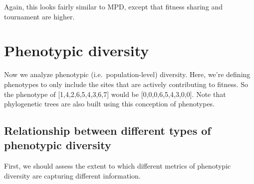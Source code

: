 \documentclass[]{book}
\newenvironment{Shaded}{\begin{snugshade}}{\end{snugshade}}
\newcommand{\DataTypeTok}[1]{\textcolor[rgb]{0.13,0.29,0.53}{#1}}
\newcommand{\DecValTok}[1]{\textcolor[rgb]{0.00,0.00,0.81}{#1}}
\newcommand{\KeywordTok}[1]{\textcolor[rgb]{0.13,0.29,0.53}{\textbf{#1}}}
\newcommand{\NormalTok}[1]{#1}
\newcommand{\OperatorTok}[1]{\textcolor[rgb]{0.81,0.36,0.00}{\textbf{#1}}}
\newcommand{\StringTok}[1]{\textcolor[rgb]{0.31,0.60,0.02}{#1}}
\begin{document}
Again, this looks fairly similar to MPD, except that fitness sharing and tournament are higher.

\hypertarget{phenotypic-diversity}{%
\section{Phenotypic diversity}\label{phenotypic-diversity}}

Now we analyze phenotypic (i.e.~population-level) diversity. Here, we're defining phenotypes to only include the sites that are actively contributing to fitness. So the phenotype of {[}1,4,2,6,5,4,3,6,7{]} would be {[}0,0,0,6,5,4,3,0,0{]}. Note that phylogenetic trees are also built using this conception of phenotypes.

\hypertarget{relationship-between-different-types-of-phenotypic-diversity}{%
\subsection{Relationship between different types of phenotypic diversity}\label{relationship-between-different-types-of-phenotypic-diversity}}

First, we should assess the extent to which different metrics of phenotypic diversity are capturing different information.

\begin{Shaded}
\end{Shaded}
\end{document}
